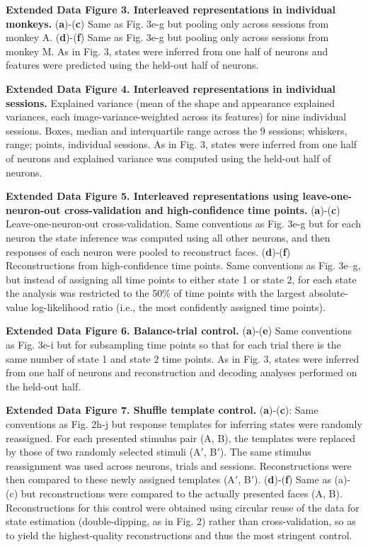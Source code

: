 \documentclass{article}
\begin{document}
\noindent\textbf{Extended Data Figure 3. Interleaved representations in individual monkeys.} (\textbf{a})-(\textbf{c}) Same as Fig. 3e-g but pooling only across sessions from monkey A. (\textbf{d})-(\textbf{f}) Same as Fig. 3e-g but pooling only across sessions from monkey M. As in Fig. 3, states were inferred from one half of neurons and features were predicted using the held-out half of neurons.



\noindent\textbf{Extended Data Figure 4. Interleaved representations in individual sessions.} Explained variance (mean of the shape and appearance explained variances, each image-variance-weighted across its features) for nine individual sessions. Boxes, median and interquartile range across the 9 sessions; whiskers, range; points, individual sessions. As in Fig. 3, states were inferred from one half of neurons and explained variance was computed using the held-out half of neurons.



\noindent\textbf{Extended Data Figure 5. Interleaved representations using leave-one-neuron-out cross-validation and high-confidence time points.} (\textbf{a})-(\textbf{c}) Leave-one-neuron-out cross-validation. Same conventions as Fig. 3e-g but for each neuron the state inference was computed using all other neurons, and then responses of each neuron were pooled to reconstruct faces. (\textbf{d})-(\textbf{f}) Reconstructions from high-confidence time points. Same conventions as Fig. 3e--g, but instead of assigning all time points to either state 1 or state 2, for each state the analysis was restricted to the 50\% of time points with the largest absolute-value log-likelihood ratio (i.e., the most confidently assigned time points).



\noindent\textbf{Extended Data Figure 6. Balance-trial control.} (\textbf{a})-(\textbf{e}) Same conventions as Fig. 3e-i but for subsampling time points so that for each trial there is the same number of state 1 and state 2 time points. As in Fig. 3, states were inferred from one half of neurons and reconstruction and decoding analyses performed on the held-out half.



\noindent\textbf{Extended Data Figure 7. Shuffle template control.} (\textbf{a})-(\textbf{c}): Same conventions as Fig. 2h-j but response templates for inferring states were randomly reassigned. For each presented stimulus pair (A, B), the templates were replaced by those of two randomly selected stimuli (A$'$, B$'$). The same stimulus reassignment was used across neurons, trials and sessions. Reconstructions were then compared to these newly assigned templates (A$'$, B$'$). (\textbf{d})-(\textbf{f}) Same as (a)-(c) but reconstructions were compared to the actually presented faces (A, B). Reconstructions for this control were obtained using circular reuse of the data for state estimation (double-dipping, as in Fig. 2) rather than cross-validation, so as to yield the highest-quality reconstructions and thus the most stringent control.
\end{document}
